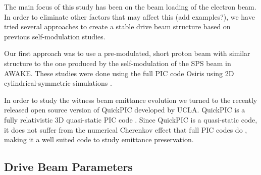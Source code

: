 \documentclass[aps,prstab,reprint,amsmath,amssymb,groupedaddress]{revtex4-1}
\begin{document}
The main focus of this study has been on the beam loading of the electron beam. In order to eliminate other factors
that may affect this (add examples?), we have tried several approaches to create a stable drive beam structure based on
previous self-modulation studies.

Our first approach was to use a pre-modulated, short proton beam with similar structure to the one produced by the
self-modulation of the SPS beam in AWAKE. These studies were done using the full PIC code Osiris \cite{fonseca:2002}
using 2D cylindrical-symmetric simulations \cite{berglyd_olsen:2015, berglyd_olsen:2016}.


In order to study the witness beam emittance evolution we turned to the recently released open source version of
QuickPIC developed by UCLA. QuickPIC is a fully relativistic 3D quasi-static PIC code \cite{huang:2006, an:2013}.
Since QuickPIC is a quasi-static code, it does not suffer from the numerical Cherenkov effect that full PIC codes do
\cite{godfrey:1974,lehe:2013}, making it a well suited code to study emittance preservation.

\subsection[\label{S:M:Setup}]{Drive Beam Parameters}
\end{document}
